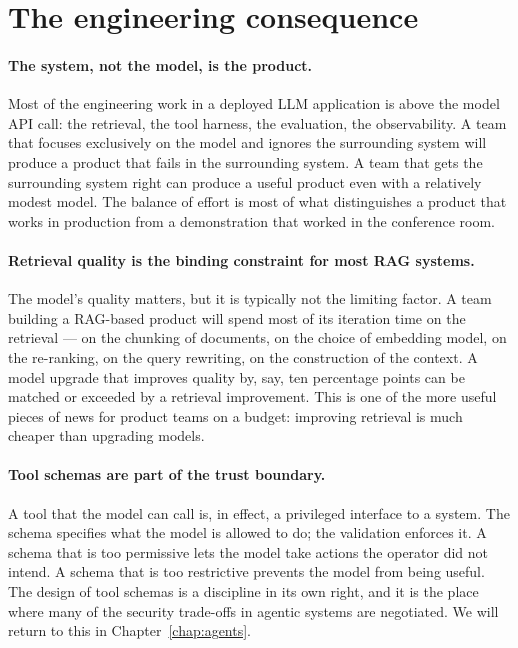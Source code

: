 \section{The engineering consequence}

\paragraph{The system, not the model, is the product.} Most
of the engineering work in a deployed LLM application is
above the model API call: the retrieval, the tool harness,
the evaluation, the observability. A team that focuses
exclusively on the model and ignores the surrounding system
will produce a product that fails in the surrounding system.
A team that gets the surrounding system right can produce a
useful product even with a relatively modest model. The
balance of effort is most of what distinguishes a product
that works in production from a demonstration that worked in
the conference room.

\paragraph{Retrieval quality is the binding constraint for
most RAG systems.} The model's quality matters, but it is
typically not the limiting factor. A team building a
RAG-based product will spend most of its iteration time on
the retrieval --- on the chunking of documents, on the choice
of embedding model, on the re-ranking, on the query
rewriting, on the construction of the context. A model
upgrade that improves quality by, say, ten percentage points
can be matched or exceeded by a retrieval improvement. This
is one of the more useful pieces of news for product teams
on a budget: improving retrieval is much cheaper than
upgrading models.

\paragraph{Tool schemas are part of the trust boundary.} A
tool that the model can call is, in effect, a privileged
interface to a system. The schema specifies what the model is
allowed to do; the validation enforces it. A schema that is
too permissive lets the model take actions the operator did
not intend. A schema that is too restrictive prevents the
model from being useful. The design of tool schemas is a
discipline in its own right, and it is the place where many
of the security trade-offs in agentic systems are negotiated.
We will return to this in Chapter~\ref{chap:agents}.

